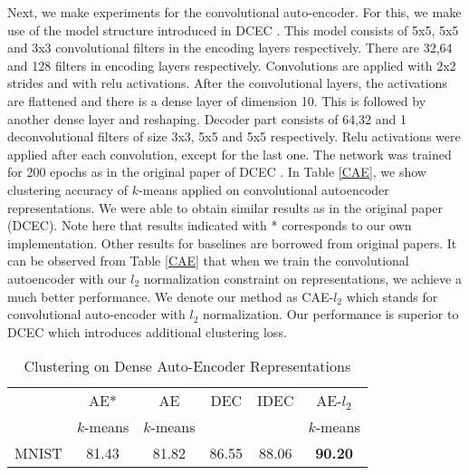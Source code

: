 \documentclass[conference]{IEEEtran}
\begin{document}
Next, we make experiments for the convolutional auto-encoder. 
For this, we make use of the model structure introduced in DCEC \cite{DCEC}. 
This model consists of  5x5, 5x5 and 3x3 convolutional filters in the encoding layers respectively. 
There are 32,64 and 128 filters in encoding layers respectively. 
Convolutions are applied with 2x2 strides and with relu \cite{RELU} activations. 
After the convolutional layers, the activations are flattened and there is a dense layer of dimension 10. 
This is followed by another dense layer and reshaping. 
Decoder part consists of 64,32 and 1 deconvolutional filters  of size 3x3, 5x5 and 5x5 respectively. 
Relu activations were applied after each convolution, except for the last one.
The network was trained for 200 epochs as in the original paper of DCEC \cite{DCEC}. 
In Table \ref{CAE}, we show clustering accuracy of $k$-means applied on convolutional autoencoder representations. 
We were able to obtain similar results as in the original paper (DCEC). 
Note here that results indicated with * corresponds to our own implementation.
Other results for baselines are borrowed from original papers.
It can be observed from Table \ref{CAE} that when we train the convolutional autoencoder with our $l_2$ normalization constraint on representations, we achieve a much better performance. 
We denote our method as CAE-$l_2$ which stands for convolutional auto-encoder with $l_2$ normalization.
Our performance is superior to DCEC which introduces additional clustering loss.


\begin{table}[!t]

\caption{Clustering on Dense Auto-Encoder Representations}
\label{AE}
\centering
\begin{adjustbox}{width=0.47\textwidth}

\begin{tabular}{|c|c|c|c|c|c|}
\hline
&AE* & AE & DEC & IDEC & AE-$l_2$\\ 
&$k$-means & $k$-means &  &  & $k$-means\\ 
\hline
MNIST&81.43 & 81.82 & 86.55 & 88.06 & \textbf{90.20}\\

\hline
\end{tabular}
\end{adjustbox}
\end{table}
\end{document}
